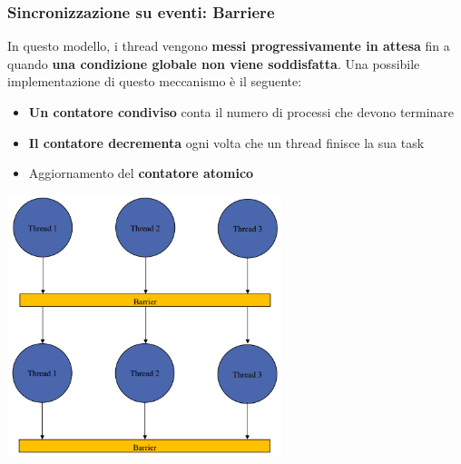 \documentclass[12pt]{article}
\begin{document}
\subsubsection{Sincronizzazione su eventi: Barriere}
In questo modello, i thread vengono \textbf{messi progressivamente in attesa} fin a quando \textbf{una condizione globale non viene soddisfatta}. Una possibile implementazione di questo meccanismo è il seguente:
\begin{itemize}
    \item \textbf{Un contatore condiviso} conta il numero di processi che devono terminare
    \item \textbf{Il contatore decrementa} ogni volta che un thread finisce la sua task
    \item Aggiornamento del \textbf{contatore atomico}
\end{itemize}
\begin{center}
    \includegraphics[width = 0.60\textwidth]{Images/82.png}
\end{center}
\end{document}
